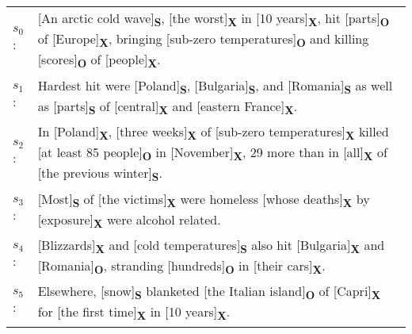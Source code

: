 \begin{examples}
\label{ex:rel-text}
\begin{tabular}{l@{\space}p{12.5cm}}
 $s_0$: &[An arctic cold wave]\textbf{\textsubscript{S}}, [the worst]\textbf{\textsubscript{X}} in [10 years]\textbf{\textsubscript{X}}, hit [parts]\textbf{\textsubscript{O}} of [Europe]\textbf{\textsubscript{X}}, bringing [sub-zero temperatures]\textbf{\textsubscript{O}} and killing [scores]\textbf{\textsubscript{O}} of [people]\textbf{\textsubscript{X}}. \\

 $s_1$: & Hardest hit were [Poland]\textbf{\textsubscript{S}}, [Bulgaria]\textbf{\textsubscript{S}}, and [Romania]\textbf{\textsubscript{S}} as well as [parts]\textbf{\textsubscript{S}} of [central]\textbf{\textsubscript{X}} and [eastern France]\textbf{\textsubscript{X}}. \\

$s_2$: &In [Poland]\textbf{\textsubscript{X}}, [three weeks]\textbf{\textsubscript{X}} of [sub-zero temperatures]\textbf{\textsubscript{X}} killed [at least 85 people]\textbf{\textsubscript{O}} in [November]\textbf{\textsubscript{X}}, 29 more than in [all]\textbf{\textsubscript{X}} of [the previous winter]\textbf{\textsubscript{S}}. \\


$s_3$: &[Most]\textbf{\textsubscript{S}} of [the victims]\textbf{\textsubscript{X}} were homeless [whose deaths]\textbf{\textsubscript{X}} by [exposure]\textbf{\textsubscript{X}} were alcohol related. \\

$s_4$: &[Blizzards]\textbf{\textsubscript{X}} and [cold temperatures]\textbf{\textsubscript{S}} also hit [Bulgaria]\textbf{\textsubscript{X}} and [Romania]\textbf{\textsubscript{O}}, stranding [hundreds]\textbf{\textsubscript{O}} in [their cars]\textbf{\textsubscript{X}}. \\

$s_5$: &Elsewhere, [snow]\textbf{\textsubscript{S}} blanketed [the Italian island]\textbf{\textsubscript{O}} of [Capri]\textbf{\textsubscript{X}} for [the first time]\textbf{\textsubscript{X}} in [10 years]\textbf{\textsubscript{X}}. 
\end{tabular}
\end{examples}

